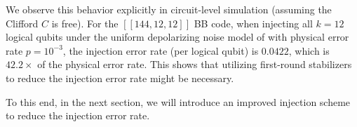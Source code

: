 We observe this behavior explicitly in circuit-level simulation (assuming the Clifford $C$ is free). For the \( [[144,12,12]] \) BB code, when injecting all \(k=12\) logical qubits under the uniform depolarizing noise model of  with physical error rate \(p=10^{-3}\), the injection error rate (per logical qubit) is \(0.0422\), which is \(42.2\times\) of the physical error rate. 
This shows that utilizing first-round stabilizers to reduce the injection error rate might be necessary.

To this end, in the next section, we will introduce an improved injection scheme to reduce the injection error rate.
